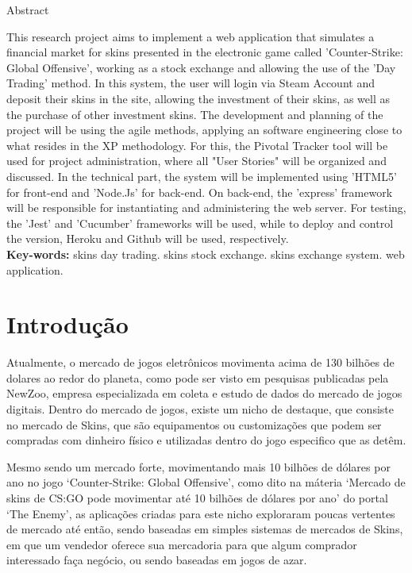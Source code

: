 \documentclass[a4paper, 12pt]{article}
\begin{document}
    \newpage %
    \begin{center}\Large Abstract \end{center}
    \thispagestyle{empty}
    \begin{flushleft}
    This research project aims to implement a web application that simulates a financial market for skins presented in the electronic game called 'Counter-Strike: Global Offensive', working as a stock exchange and allowing the use of the 'Day Trading' method. In this system, the user will login via Steam Account and deposit their skins in the site, allowing the investment of their skins, as well as the purchase of other investment skins. The development and planning of the project will be using the agile methods, applying an software engineering close to what resides in the XP methodology. For this, the Pivotal Tracker tool will be used for project administration, where all "User Stories" will be organized and discussed. In the technical part, the system will be implemented using 'HTML5' for front-end and 'Node.Js' for back-end. On back-end, the 'express' framework will be responsible for instantiating and administering the web server. For testing, the 'Jest' and 'Cucumber' frameworks will be used, while to deploy and control the version, Heroku and Github will be used, respectively. \\
    
    \textbf{Key-words: } skins day trading. skins stock exchange. skins exchange system. web application.
    \end{flushleft}

    \newpage %
    \section{Introdução}
    Atualmente, o mercado de jogos eletrônicos movimenta acima de 130 bilhões de dolares ao redor do planeta, como pode ser visto em pesquisas publicadas pela NewZoo, empresa especializada em coleta e estudo de dados do mercado de jogos digitais. Dentro do mercado de jogos, existe um nicho de destaque, que consiste no mercado de Skins, que são equipamentos ou customizações que podem ser compradas com dinheiro físico e utilizadas dentro do jogo especifico que as detêm.
    
    Mesmo sendo um mercado forte, movimentando mais 10 bilhões de dólares por ano no jogo ‘Counter-Strike: Global Offensive’, como dito na máteria ‘Mercado de skins de CS:GO pode movimentar até 10 bilhões de dólares por ano’ do portal ‘The Enemy’, as aplicações criadas para este nicho exploraram poucas vertentes de mercado até então, sendo baseadas em simples sistemas de mercados de Skins, em que um vendedor oferece sua mercadoria para que algum comprador interessado faça negócio, ou sendo baseadas em jogos de azar.
    
\end{document}
